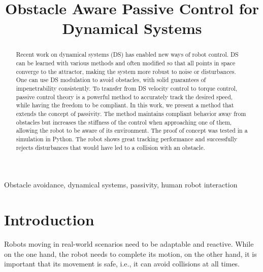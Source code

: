 \documentclass[conference]{IEEEtran}
\begin{document}
\newcommand{\vect}[1]{\boldsymbol{#1}}
\newcommand{\vecs}[1]{\boldsymbol{#1}}
\newcommand{\matr}[1]{\boldsymbol{#1}}
\newcommand{\matd}[1]{\mathcal{#1}}

\newcommand{\dotprod}[2]{\left\langle {#1}, \, {#2} \right\rangle}
\newcommand{\normdotprod}[2]{\frac{\left\langle #1, \, #2 \right\rangle}{\| #1 \| \, \| #2 \|}}

\newtheorem{theorem}{Theorem}[section]
\newtheorem{corollary}{Corollary}[section]
\newtheorem{lemma}{Lemma}[section]
\theoremstyle{definition}
\newtheorem{definition}{Definition}[section]


\title{Obstacle Aware Passive Control for Dynamical Systems}
\author{
}

\maketitle
\thispagestyle{plain}
\pagestyle{plain}

\begin{abstract}
Recent work on dynamical systems (DS) has enabled new ways of robot control. DS can be learned with various methods and often modified so that all points in space converge to the attractor, making the system more robust to noise or disturbances.
One can use DS modulation to avoid obstacles, with solid guarantees of impenetrability consistently. To transfer from DS velocity control to torque control, passive control theory is a powerful method to accurately track the desired speed, while having the freedom to be compliant.
In this work, we present a method that extends the concept of passivity.
The method maintains compliant behavior away from obstacles but increases the stiffness of the control when approaching one of them, allowing the robot to be aware of its environment.
The proof of concept was tested in a simulation in Python. The robot shows great tracking performance and successfully rejects disturbances that would have led to a collision with an obstacle. 
\end{abstract}

\begin{IEEEkeywords}
Obstacle avoidance, dynamical systems, passivity, human robot interaction
\end{IEEEkeywords}


\section{Introduction}
Robots moving in real-world scenarios need to be adaptable and reactive.
While on the one hand, the robot needs to complete its motion, on the other hand, it is important that its movement is safe, i.e., it can avoid collisions at all times.
\end{document}

